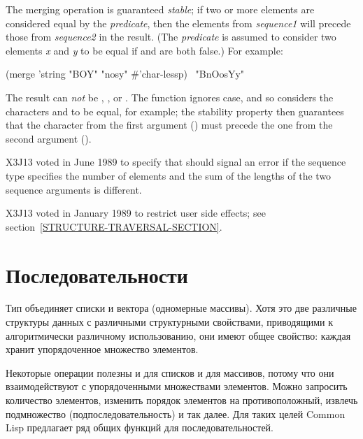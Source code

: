 \begin{defun}[Function]
The merging operation is guaranteed
\emph{stable}; if two or more elements are considered equal by the
\emph{predicate}, then the elements from \emph{sequence1} will
precede those from \emph{sequence2} in the result.
(The \emph{predicate} is assumed to
consider two elements \emph{x} and \emph{y} to be equal if
 and
 are both false.)
For example:
\begin{lisp}
(merge 'string "BOY" "nosy" \#'char-lessp) \EV\ "BnOosYy"
\end{lisp}
The result can \emph{not} be , , or .
The function  ignores case, and so considers
the characters  and  to be equal, for example;
the stability property then guarantees that the character from the
first argument () must precede the one from the second
argument ().

\begin{newer}
X3J13 voted in June 1989  to specify that
 should signal an error if the sequence type specifies the number of
elements and the sum of the lengths of the two sequence arguments is
different.
\end{newer}

\begin{new}
X3J13 voted in January 1989
to restrict user side effects; see section~\ref{STRUCTURE-TRAVERSAL-SECTION}.
\end{new}
\end{defun}

\else

\chapter{Последовательности}
\label{KSEQUE}

Тип  объединяет списки и вектора (одномерные массивы).
Хотя это две различные структуры данных с различными структурными
свойствами, приводящими к алгоритмически различному использованию, они имеют
общее свойство: каждая хранит упорядоченное множество элементов.

Некоторые операции полезны и для списков и для массивов, потому что они
взаимодействуют с упорядоченными множествами элементов. Можно запросить
количество элементов, изменить порядок элементов на противоположный, извлечь
подмножество (подпоследовательность) и так далее. Для таких целей Common Lisp
предлагает ряд общих функций для последовательностей.

